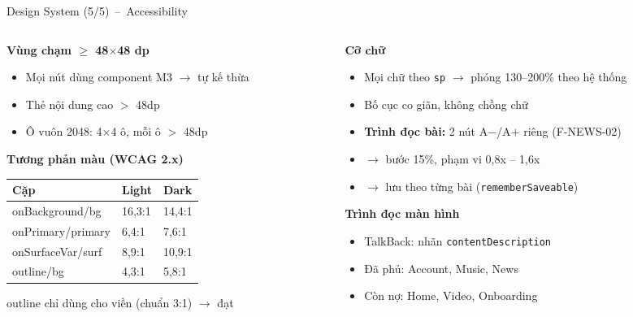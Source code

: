 \documentclass[aspectratio=169]{beamer}
\begin{document}
\begin{frame}{Design System (5/5)~--~Accessibility}
  \begin{columns}
    \begin{column}{0.48\textwidth}
      {\small\textbf{Vùng chạm $\geq$ 48$\times$48 dp}}\vspace{1mm}
      {\tiny
      \begin{itemize}\itemsep2pt
        \item Mọi nút dùng component M3 $\rightarrow$ tự kế thừa
        \item Thẻ nội dung cao $>$ 48dp
        \item Ô vuôn 2048: 4$\times$4 ô, mỗi ô $>$ 48dp
      \end{itemize}}\vspace{2mm}
      {\small\textbf{Tương phản màu (WCAG 2.x)}}\vspace{1mm}
      {\tiny
      \begin{tabular}{@{}lll@{}}
        \toprule
        \textbf{Cặp} & \textbf{Light} & \textbf{Dark} \\
        \midrule
        onBackground/bg & 16,3:1 & 14,4:1 \\
        onPrimary/primary & 6,4:1 & 7,6:1 \\
        onSurfaceVar/surf & 8,9:1 & 10,9:1 \\
        outline/bg & 4,3:1 & 5,8:1 \\
        \bottomrule
      \end{tabular}}\vspace{1mm}
      {\tiny\color{brandgray} outline chỉ dùng cho viền (chuẩn 3:1) $\rightarrow$ đạt}
    \end{column}
    \begin{column}{0.48\textwidth}
      {\small\textbf{Cỡ chữ}}\vspace{1mm}
      {\tiny
      \begin{itemize}\itemsep2pt
        \item Mọi chữ theo \texttt{sp} $\rightarrow$ phóng 130--200\% theo hệ thống
        \item Bố cục co giãn, không chồng chữ
        \item \textbf{Trình đọc bài:} 2 nút A$-$/A$+$ riêng (F-NEWS-02)
        \item $\rightarrow$ bước 15\%, phạm vi 0,8x -- 1,6x
        \item $\rightarrow$ lưu theo từng bài (\texttt{rememberSaveable})
      \end{itemize}}\vspace{2mm}
      {\small\textbf{Trình đọc màn hình}}\vspace{1mm}
      {\tiny
      \begin{itemize}\itemsep2pt
        \item TalkBack: nhãn \texttt{contentDescription}
        \item Đã phủ: Account, Music, News
        \item Còn nợ: Home, Video, Onboarding
      \end{itemize}}
    \end{column}
  \end{columns}
\end{frame}
\end{document}
